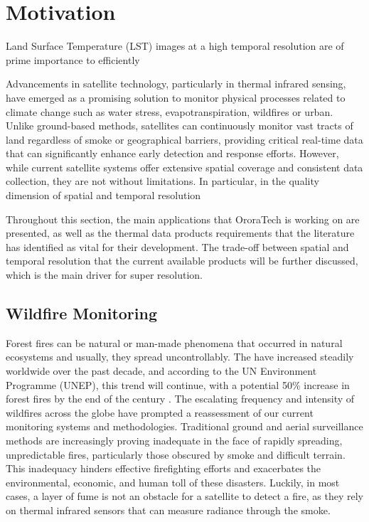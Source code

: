     
    

\section{Motivation}

Land Surface Temperature (LST) images at a high temporal resolution are of prime importance to efficiently 

Advancements in satellite technology, particularly in thermal infrared sensing, have emerged as a promising solution to monitor physical processes related to climate change such as water stress, evapotranspiration, wildfires or urban.
Unlike ground-based methods, satellites can continuously monitor vast tracts of land regardless of smoke or geographical barriers, providing critical real-time data that can significantly enhance early detection and response efforts. 
However, while current satellite systems offer extensive spatial coverage and consistent data collection, they are not without limitations. 
In particular, in the quality dimension of spatial and temporal resolution

Throughout this section, the main applications that OroraTech is working on are presented, as well as the thermal data products requirements that the literature has identified as vital for their development.
The trade-off between spatial and temporal resolution that the current available products will be further discussed, which is the main driver for super resolution.
    

    \subsection{Wildfire Monitoring}

    Forest fires can be natural or man-made phenomena that occurred in natural ecosystems and usually, they spread uncontrollably.
    The have increased steadily worldwide over the past decade, and according to the UN Environment Programme (UNEP), this trend will continue, with a potential 50\% increase in forest fires by the end of the century \cite{UNEP2021Wildfire}. 
    The escalating frequency and intensity of wildfires across the globe have prompted a reassessment of our current monitoring systems and methodologies. Traditional ground and aerial surveillance methods are increasingly proving inadequate in the face of rapidly spreading, unpredictable fires, particularly those obscured by smoke and difficult terrain. This inadequacy hinders effective firefighting efforts and exacerbates the environmental, economic, and human toll of these disasters. 
    Luckily, in most cases, a layer of fume is not an obstacle for a satellite to detect a fire, as they rely on thermal infrared sensors that can measure radiance through the smoke.

